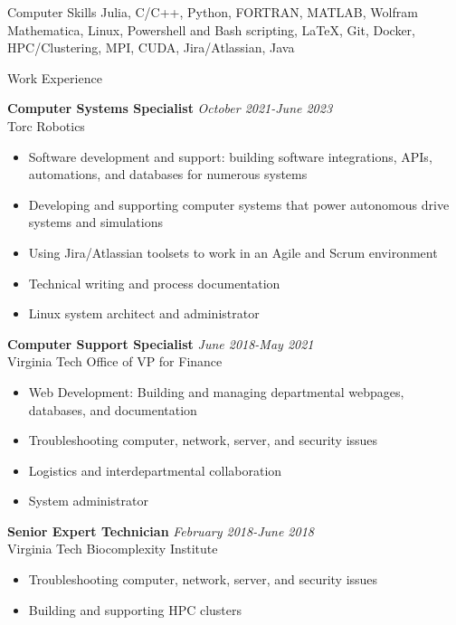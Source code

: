\documentclass{resume} %
\begin{document}
\begin{rSection}{Computer Skills}
    Julia, C/C++, Python, FORTRAN, MATLAB, Wolfram Mathematica, Linux, Powershell and Bash scripting, \LaTeX, Git, Docker, HPC/Clustering, MPI, CUDA, Jira/Atlassian, Java
\end{rSection}

\begin{rSection}{Work Experience}

\textbf{Computer Systems Specialist} \hfill \textit{October 2021-June 2023} \\
Torc Robotics
 \begin{itemize}
    \itemsep -3pt {} 
     \item Software development and support: building software integrations, APIs, automations, and databases for numerous systems
     \item Developing and supporting computer systems that power autonomous drive systems and simulations
     \item Using Jira/Atlassian toolsets to work in an Agile and Scrum environment
     \item Technical writing and process documentation
     \item Linux system architect and administrator
 \end{itemize}
 
\textbf{Computer Support Specialist} \hfill \textit{June 2018-May 2021} \\
Virginia Tech Office of VP for Finance
 \begin{itemize}
    \itemsep -3pt {} 
     \item Web Development: Building and managing departmental webpages, databases, and documentation
     \item Troubleshooting computer, network, server, and security issues
     \item Logistics and interdepartmental collaboration
     \item System administrator
 \end{itemize}

\vspace{10pt}

 \textbf{Senior Expert Technician} \hfill \textit{February 2018-June 2018} \\
 Virginia Tech Biocomplexity Institute
  \begin{itemize}
     \itemsep -3pt {} 
      \item Troubleshooting computer, network, server, and security issues
      \item Building and supporting HPC clusters
  \end{itemize}


\end{rSection}
\end{document}

